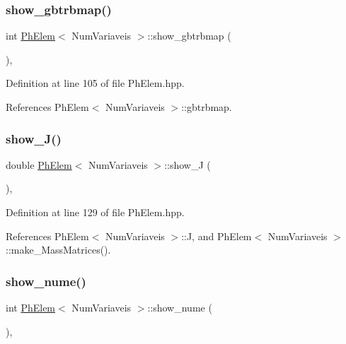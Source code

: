 \subsubsection{\texorpdfstring{show\+\_\+gbtrbmap()}{show\_gbtrbmap()}}
{\footnotesize\ttfamily int \hyperlink{classPhElem}{Ph\+Elem}$<$ Num\+Variaveis $>$\+::show\+\_\+gbtrbmap (\begin{DoxyParamCaption}{ }\end{DoxyParamCaption})\hspace{0.3cm}{\ttfamily [inline]}, {\ttfamily [inherited]}}



Definition at line 105 of file Ph\+Elem.\+hpp.



References Ph\+Elem$<$ Num\+Variaveis $>$\+::gbtrbmap.

\mbox{\label{classPhElem_a63b2f67b4f782432909cd7d32d188996}} 
\subsubsection{\texorpdfstring{show\+\_\+\+J()}{show\_J()}}
{\footnotesize\ttfamily double \hyperlink{classPhElem}{Ph\+Elem}$<$ Num\+Variaveis $>$\+::show\+\_\+J (\begin{DoxyParamCaption}{ }\end{DoxyParamCaption})\hspace{0.3cm}{\ttfamily [inline]}, {\ttfamily [inherited]}}



Definition at line 129 of file Ph\+Elem.\+hpp.



References Ph\+Elem$<$ Num\+Variaveis $>$\+::J, and Ph\+Elem$<$ Num\+Variaveis $>$\+::make\+\_\+\+Mass\+Matrices().

\mbox{\label{classPhElem_aca4ef303cd316714d116062e8f4d8ca5}} 
\subsubsection{\texorpdfstring{show\+\_\+nume()}{show\_nume()}}
{\footnotesize\ttfamily int \hyperlink{classPhElem}{Ph\+Elem}$<$ Num\+Variaveis $>$\+::show\+\_\+nume (\begin{DoxyParamCaption}{ }\end{DoxyParamCaption})\hspace{0.3cm}{\ttfamily [inline]}, {\ttfamily [inherited]}}



